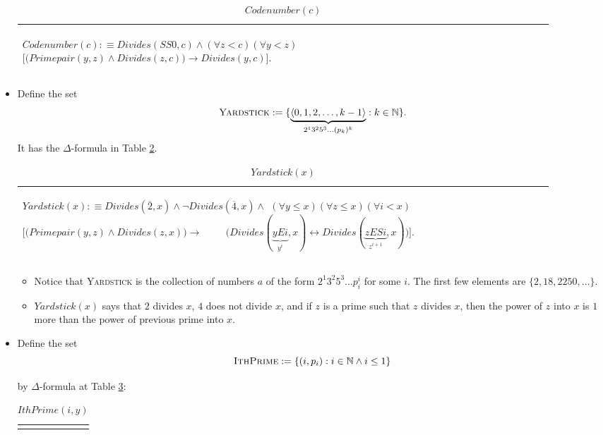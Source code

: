 \documentclass[11pt,letterpaper]{book}
\theoremstyle{definition}
\begin{document}
\begin{itemize}
{\begin{table}[h]
\caption{$Codenumber(c)$}
\label{box:codenumber}
\begin{tabular}{|p{0.9\linewidth}|}
\hline
\rule{0pt}{3ex}
\begin{center}
$ Codenumber(c) :\equiv Divides(SS0, c) \land (\forall z < c) (\forall y < z) $
$ \Big[ \big(Primepair(y,z) \land Divides(z, c)  \big)
\rightarrow Divides(y, c) \Big]. $
\end{center} \\
\hline
\end{tabular}
\end{table}
}
\item{Define the set
$$ \text{\textsc{Yardstick}} := \{ \underbrace{ \langle 0, 1, 2, \ldots, k-1 \rangle }_{2^1 3^2 5^3 \ldots (p_k) ^k}: k \in \mathbb{N} \} . $$
It has the $\Delta$-formula in Table \ref{box:yardstick}.
\begin{table}[h]
\caption{ $Yardstick(x)$ }
\label{box:yardstick}
\begin{tabular}{|p{0.9\linewidth}|}
\hline
\rule{0pt}{3ex}
\begin{center}
$Yardstick(x) : \equiv Divides(\overline{2}, x) \land \lnot Divides(\overline{4} , x) \land$
$ (\forall y \leq x ) (\forall z \leq x )(\forall i < x ) $
$ \Big[ \big( Primepair(y, z) \land Divides(z, x) \big) \rightarrow$
$\quad \quad  \big( Divides(\underbrace{y E i}_{y^i}, x) \leftrightarrow Divides( \underbrace{z E S i}_{z^{i+1}} , x)
\big) \Big].$
\end{center} \\
\hline
\end{tabular}
\end{table}
}
\begin{itemize}
\item{Notice that \textsc{Yardstick} is the collection of numbers $a$ of the
form $2^1 3^2 5^3 \ldots p_i ^i$ for some $i$. The first few elements are $ \{ 2, 18, 2250, \ldots \}$.}
\item{$Yardstick(x)$ says that $2$ divides $x$, $4$ does not divide $x$,
and if $z$ is a prime such that $z$ divides $x$, then the power of $z$
into $x$ is $1$ more than the power of previous prime into $x$.}
\end{itemize}

\item{Define the set
$$ \text{\textsc{IthPrime}} : = \{ (i, p_i) : i \in \mathbb{N} \land i \leq 1 \} $$

by $\Delta$-formula at Table \ref{box:ith_prime}:
\begin{table}[h]
\caption{$IthPrime(i, y)$}
\label{box:ith_prime}
\begin{tabular}{|p{0.9\linewidth}|}
\hline
\rule{0pt}{3ex}


\end{tabular}
\end{table}}
\end{itemize}
\end{document}
